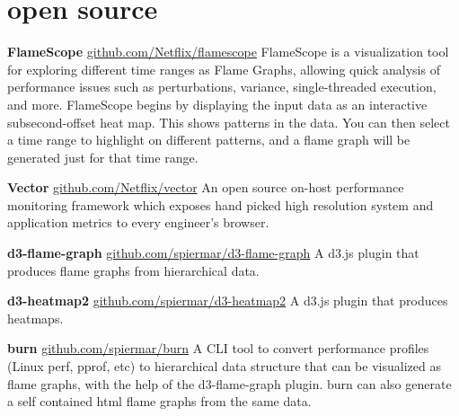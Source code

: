 \section{open source}

\textbf{FlameScope}
\newline
\vspace{\parsep}
{ \href{https://github.com/Netflix/flamescope}{github.com/Netflix/flamescope}}
\newline
FlameScope is a visualization tool for exploring different time ranges as Flame Graphs, allowing quick analysis of performance issues such as perturbations, variance, single-threaded execution, and more.
\newline
FlameScope begins by displaying the input data as an interactive subsecond-offset heat map. This shows patterns in the data. You can then select a time range to highlight on different patterns, and a flame graph will be generated just for that time range.
\newline
\vspace{\parsep}

\textbf{Vector}
\newline
\vspace{\parsep}
{ \href{https://github.com/Netflix/vector}{github.com/Netflix/vector}}
\newline
An open source on-host performance monitoring framework which exposes hand picked high resolution system and application metrics to every engineer’s browser.
\newline
\vspace{\parsep}

\textbf{d3-flame-graph}
\newline
\vspace{\parsep}
{ \href{https://github.com/spiermar/d3-flame-graph}{github.com/spiermar/d3-flame-graph}}
\newline
A d3.js plugin that produces flame graphs from hierarchical data.
\newline
\vspace{\parsep}

\textbf{d3-heatmap2}
\newline
\vspace{\parsep}
{ \href{https://github.com/spiermar/d3-heatmap2}{github.com/spiermar/d3-heatmap2}}
\newline
A d3.js plugin that produces heatmaps.
\newline
\vspace{\parsep}

\textbf{burn}
\newline
\vspace{\parsep}
{ \href{https://github.com/spiermar/burn}{github.com/spiermar/burn}}
\newline
A CLI tool to convert performance profiles (Linux perf, pprof, etc) to hierarchical data structure that can be visualized as flame graphs, with the help of the d3-flame-graph plugin. burn can also generate a self contained html flame graphs from the same data.
\newline
\vspace{\parsep}
